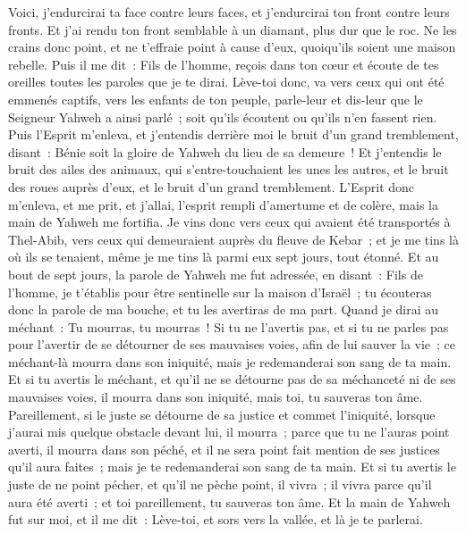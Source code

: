 \begin{multicols}{2}
Voici, j'endurcirai ta face contre leurs faces, et j'endurcirai ton front contre leurs fronts.
Et j'ai rendu ton front semblable à un diamant, plus dur que le roc. Ne les crains donc point, et ne t'effraie point à cause d'eux, quoiqu'ils soient une maison rebelle.
Puis il me dit~: Fils de l'homme, reçois dans ton cœur et écoute de tes oreilles toutes les paroles que je te dirai.
Lève-toi donc, va vers ceux qui ont été emmenés captifs, vers les enfants de ton peuple, parle-leur et dis-leur que le Seigneur Yahweh a ainsi parlé~; soit qu'ils écoutent ou qu'ils n'en fassent rien.
Puis l'Esprit m'enleva, et j'entendis derrière moi le bruit d'un grand tremblement, disant~: Bénie soit la gloire de Yahweh du lieu de sa demeure~!
Et j'entendis le bruit des ailes des animaux, qui s'entre-touchaient les unes les autres, et le bruit des roues auprès d'eux, et le bruit d'un grand tremblement.
L'Esprit donc m'enleva, et me prit, et j'allai, l'esprit rempli d'amertume et de colère, mais la main de Yahweh me fortifia.
Je vins donc vers ceux qui avaient été transportés à Thel-Abib, vers ceux qui demeuraient auprès du fleuve de Kebar~; et je me tins là où ils se tenaient, même je me tins là parmi eux sept jours, tout étonné.
Et au bout de sept jours, la parole de Yahweh me fut adressée, en disant~:
Fils de l'homme, je t'établis pour être sentinelle sur la maison d'Israël~; tu écouteras donc la parole de ma bouche, et tu les avertiras de ma part.
Quand je dirai au méchant~: Tu mourras, tu mourras~! Si tu ne l'avertis pas, et si tu ne parles pas pour l'avertir de se détourner de ses mauvaises voies, afin de lui sauver la vie~; ce méchant-là mourra dans son iniquité, mais je redemanderai son sang de ta main.
Et si tu avertis le méchant, et qu'il ne se détourne pas de sa méchanceté ni de ses mauvaises voies, il mourra dans son iniquité, mais toi, tu sauveras ton âme.
Pareillement, si le juste se détourne de sa justice et commet l'iniquité, lorsque j'aurai mis quelque obstacle devant lui, il mourra~; parce que tu ne l'auras point averti, il mourra dans son péché, et il ne sera point fait mention de ses justices qu'il aura faites~; mais je te redemanderai son sang de ta main.
Et si tu avertis le juste de ne point pécher, et qu'il ne pèche point, il vivra~; il vivra parce qu'il aura été averti~; et toi pareillement, tu sauveras ton âme.
Et la main de Yahweh fut sur moi, et il me dit~: Lève-toi, et sors vers la vallée, et là je te parlerai.

\end{multicols}
